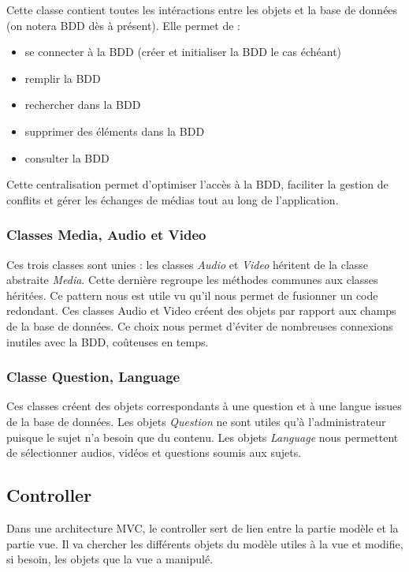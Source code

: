 Cette classe contient toutes les intéractions entre les objets et la base de données (on notera BDD dès à présent). Elle permet de :

\begin{itemize}
 \item se connecter à la BDD (créer et initialiser la BDD le cas échéant)
 \item remplir la BDD
 \item rechercher dans la BDD
 \item supprimer des éléments dans la BDD
 \item consulter la BDD
\end{itemize}

Cette centralisation permet d'optimiser l'accès à la BDD, faciliter la gestion de conflits et gérer les échanges de médias tout au long de l'application.

\subsubsection{Classes Media, Audio et Video}

Ces trois classes sont unies : les classes \textit{Audio} et \textit{Video} héritent de la classe abstraite \textit{Media}. Cette dernière regroupe les méthodes communes aux classes héritées. Ce pattern nous est utile vu qu'il nous permet de fusionner un code redondant. Ces classes Audio et Video créent des objets par rapport aux champs de la base de données. Ce choix nous permet d'éviter de nombreuses connexions inutiles avec la BDD, coûteuses en temps.

\subsubsection{Classe Question, Language}

Ces classes créent des objets correspondants à une question et à une langue issues de la base de données.
Les objets \textit{Question} ne sont utiles qu'à l'administrateur puisque le sujet n'a besoin que du contenu.
Les objets \textit{Language} nous permettent de sélectionner audios, vidéos et questions soumis aux sujets.

\subsection{Controller}\label{archi_controller}

Dans une architecture MVC, le controller sert de lien entre la partie modèle et la partie vue. Il va chercher les différents objets du modèle utiles à la vue et modifie, si besoin, les objets que la vue a manipulé.

